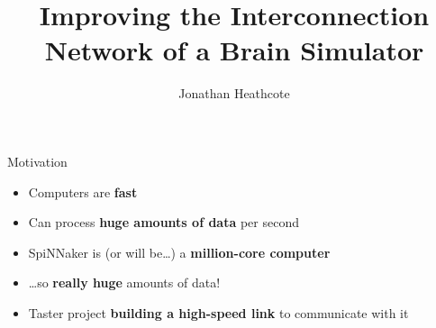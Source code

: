 \documentclass[t]{beamer}
\title{Improving the Interconnection Network of a Brain Simulator}
\author{Jonathan Heathcote}
\date{}
\begin{document}
	
	\maketitle
	
	\begin{frame}{Motivation}
		
		\begin{itemize}
			
			\item Computers are \textbf{fast}
			\item Can process \textbf{huge amounts of data} per second
			\item SpiNNaker is (or will be\ldots) a \textbf{million-core computer}
			\item \ldots{}so \textbf{really huge} amounts of data!
			\item Taster project \textbf{building a high-speed link} to communicate
			with it
			
		\end{itemize}
		
	\end{frame}
	
\end{document}
